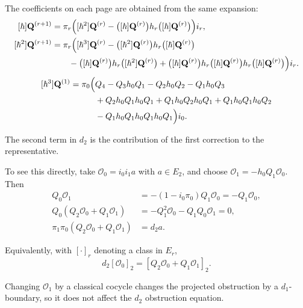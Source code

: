 \documentclass[11pt]{article}
\numberwithin{equation}{section}
\numberwithin{figure}{section}
\numberwithin{table}{section}
\begin{document}
The coefficients on each page are obtained from the same expansion:
\begin{equation}\label{local-ch8-transfer-coefficients}
\begin{aligned}
[\hbar]\mathbf Q^{(r+1)}
&=\pi_r\Bigl([\hbar^2]\mathbf Q^{(r)}-
\bigl([\hbar]\mathbf Q^{(r)}\bigr)h_r\bigl([\hbar]\mathbf Q^{(r)}\bigr)\Bigr)i_r,\\
[\hbar^2]\mathbf Q^{(r+1)}
&=\pi_r\Bigl([\hbar^3]\mathbf Q^{(r)}
-\bigl([\hbar^2]\mathbf Q^{(r)}\bigr)h_r\bigl([\hbar]\mathbf Q^{(r)}\bigr)\\
&\qquad-\bigl([\hbar]\mathbf Q^{(r)}\bigr)h_r\bigl([\hbar^2]\mathbf Q^{(r)}\bigr)
+\bigl([\hbar]\mathbf Q^{(r)}\bigr)h_r\bigl([\hbar]\mathbf Q^{(r)}\bigr)h_r\bigl([\hbar]\mathbf Q^{(r)}\bigr)\Bigr)i_r.
\end{aligned}
\end{equation}
\begin{equation}\label{local-ch8-first-page-four-loop}
\begin{aligned}
[\hbar^3]\mathbf Q^{(1)}=\pi_0\Bigl(
&Q_4-Q_3h_0Q_1-Q_2h_0Q_2-Q_1h_0Q_3\\
&+Q_2h_0Q_1h_0Q_1+Q_1h_0Q_2h_0Q_1+Q_1h_0Q_1h_0Q_2\\
&-Q_1h_0Q_1h_0Q_1h_0Q_1\Bigr)i_0.
\end{aligned}
\end{equation}

The second term in $d_2$ is the contribution of the first correction to the representative.

To see this directly, take $\mathcal O_0=i_0i_1a$ with $a\in E_2$, and choose $\mathcal O_1=-h_0Q_1\mathcal O_0$.~ Then
\begin{equation}\label{eq-d2closure}
\begin{aligned}
Q_0\mathcal O_1
&=-(1-i_0\pi_0)Q_1\mathcal O_0=-Q_1\mathcal O_0,\\
Q_0(Q_2\mathcal O_0+Q_1\mathcal O_1)
&=-Q_1^2\mathcal O_0-Q_1Q_0\mathcal O_1=0,\\
\pi_1\pi_0(Q_2\mathcal O_0+Q_1\mathcal O_1)&=d_2a.
\end{aligned}
\end{equation}

Equivalently, with $[\cdot]_r$ denoting a class in $E_r$,
\begin{equation}\label{eq-d2}
d_2[\mathcal O_0]_2
=[Q_2\mathcal O_0+Q_1\mathcal O_1]_2.
\end{equation}

Changing $\mathcal O_1$ by a classical cocycle changes the projected obstruction by a $d_1$-boundary, so it does not affect the $d_2$ obstruction equation.
\end{document}
